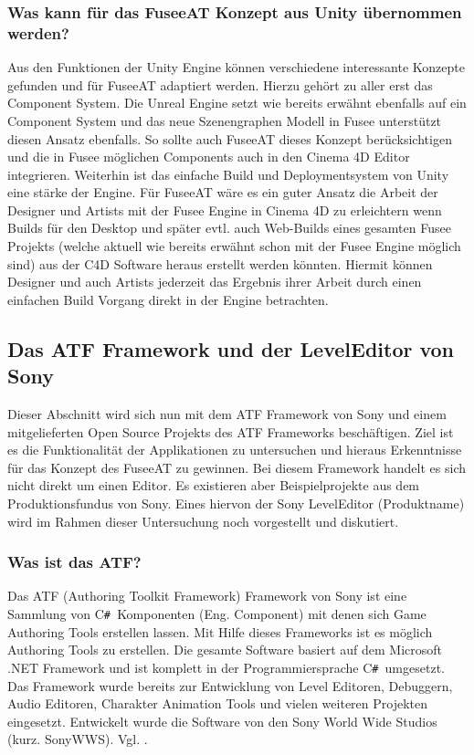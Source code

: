 \documentclass[pagesize, paper=a4, fontsize=12pt, titlepage=true, headings=small, headnosepline, abstractoff, liststotoc, nochapterprefix, plainheadsepline, twoside]{scrreprt}
\newcommand{\CSS}{C\texttt{\# }}
\begin{document}
\subsubsection{Was kann für das FuseeAT Konzept aus Unity übernommen werden?}
Aus den Funktionen der Unity Engine können verschiedene interessante Konzepte gefunden und für FuseeAT adaptiert werden. Hierzu gehört zu aller erst das Component System. Die Unreal Engine setzt wie bereits erwähnt ebenfalls auf ein Component System und das neue Szenengraphen Modell in Fusee unterstützt diesen Ansatz ebenfalls. So sollte auch FuseeAT dieses Konzept berücksichtigen und die in Fusee möglichen Components auch in den Cinema 4D Editor integrieren. Weiterhin ist das einfache Build und Deploymentsystem von Unity eine stärke der Engine. Für FuseeAT wäre es ein guter Ansatz die Arbeit der Designer und Artists mit der Fusee Engine in Cinema 4D zu erleichtern wenn Builds für den Desktop und später evtl. auch Web-Builds eines gesamten Fusee Projekts (welche aktuell wie bereits erwähnt schon mit der Fusee Engine möglich sind) aus der C4D Software heraus erstellt werden könnten. Hiermit können  Designer und auch Artists jederzeit das Ergebnis ihrer Arbeit durch einen einfachen Build Vorgang direkt in der Engine betrachten.


\subsection{Das ATF Framework und der LevelEditor von Sony}
Dieser Abschnitt wird sich nun mit dem ATF Framework von Sony und einem mitgelieferten Open Source Projekts des ATF Frameworks beschäftigen. Ziel ist es die Funktionalität der Applikationen zu untersuchen und hieraus Erkenntnisse für das Konzept des FuseeAT zu gewinnen. Bei diesem Framework handelt es sich nicht direkt um einen Editor. Es existieren aber Beispielprojekte aus dem Produktionsfundus von Sony. Eines hiervon der Sony LevelEditor (Produktname) wird im Rahmen dieser Untersuchung noch vorgestellt und diskutiert.

\subsubsection{Was ist das ATF?}
Das ATF (Authoring Toolkit Framework) Framework von Sony ist eine Sammlung von \CSS Komponenten (Eng. Component) mit denen sich Game Authoring Tools erstellen lassen. Mit Hilfe dieses Frameworks ist es möglich Authoring Tools zu erstellen. Die gesamte Software basiert auf dem Microsoft .NET Framework und ist komplett in der Programmiersprache \CSS umgesetzt. Das Framework wurde bereits zur Entwicklung von Level Editoren, Debuggern, Audio Editoren, Charakter Animation Tools und vielen weiteren Projekten eingesetzt. Entwickelt wurde die Software von den Sony World Wide Studios (kurz. SonyWWS). Vgl. .
\end{document}

